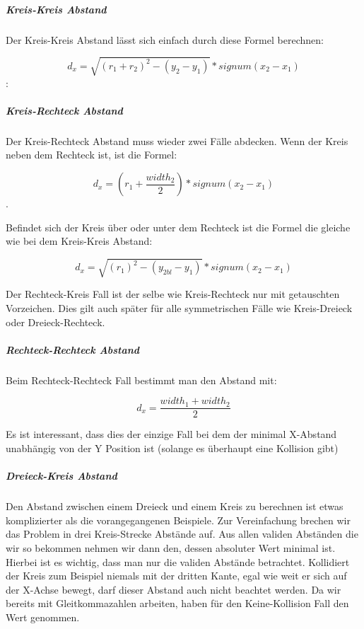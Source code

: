 \subparagraph{Kreis-Kreis Abstand}

Der Kreis-Kreis Abstand lässt sich einfach durch diese Formel berechnen:

$$d_x = \sqrt{(r_1 + r_2)^2 - (y_2 - y_1)} * signum(x_2 - x_1)$$:


\subparagraph{Kreis-Rechteck Abstand}

Der Kreis-Rechteck Abstand muss wieder zwei Fälle abdecken. Wenn der Kreis neben dem Rechteck ist, ist die Formel:

$$d_x = (r_1 + \frac{width_2}{2}) * signum(x_2 - x_1)$$. 

Befindet sich der Kreis über oder unter dem Rechteck ist die Formel die gleiche wie bei dem Kreis-Kreis Abstand:

$$d_x = \sqrt{(r_1)^2 - (y_{2bl} - y_1)} * signum(x_2 - x_1)$$


Der Rechteck-Kreis Fall ist der selbe wie Kreis-Rechteck nur mit getauschten Vorzeichen. Dies gilt auch später für alle symmetrischen Fälle wie Kreis-Dreieck oder Dreieck-Rechteck.

\subparagraph{Rechteck-Rechteck Abstand}

Beim Rechteck-Rechteck Fall bestimmt man den Abstand mit:

$$d_x = \frac{width_1 + width_2}{2}$$


Es ist interessant, dass dies der einzige Fall bei dem der minimal X-Abstand unabhängig von der Y Position ist (solange es überhaupt eine Kollision gibt)

\subparagraph{Dreieck-Kreis Abstand}

Den Abstand zwischen einem Dreieck und einem Kreis zu berechnen ist etwas komplizierter als die vorangegangenen Beispiele. Zur Vereinfachung brechen wir das Problem in drei Kreis-Strecke Abstände auf. Aus allen validen Abständen die wir so bekommen nehmen wir dann den, dessen absoluter Wert minimal ist. Hierbei ist es wichtig, dass man nur die validen Abstände  betrachtet. Kollidiert der Kreis zum Beispiel niemals mit der dritten Kante, egal wie weit er sich auf der X-Achse bewegt, darf dieser Abstand auch nicht beachtet werden. 
Da wir bereits mit Gleitkommazahlen arbeiten, haben für den Keine-Kollision Fall den Wert  genommen.

